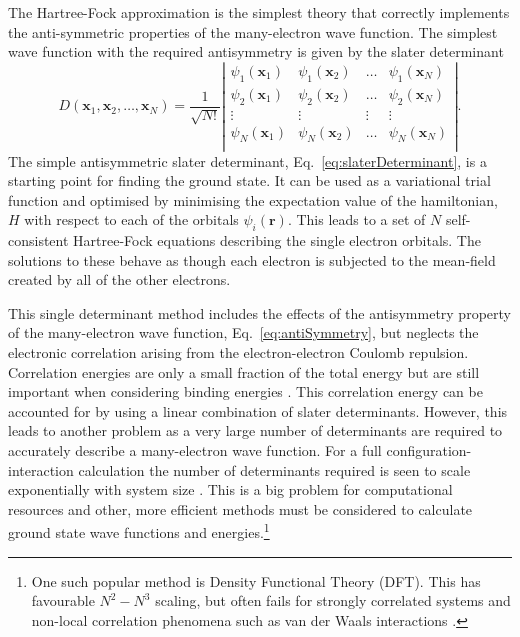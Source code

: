 The Hartree-Fock approximation \cite{modernChemistry,bransden,James1996} is the simplest theory that correctly implements the anti-symmetric properties of the many-electron wave function. The simplest wave function with the required antisymmetry is given by the slater determinant
\begin{equation}
\label{eq:slaterDeterminant}
D(\textbf{x}_1,\textbf{x}_2,\dotsc,\textbf{x}_N) = \frac{1}{\sqrt{N!}}
\left\lvert 
\begin{array}{cccc} 
\psi_1(\textbf{x}_1) & \psi_1(\textbf{x}_2) & \dotsc & \psi_1(\textbf{x}_N) \\ 
\psi_2(\textbf{x}_1) & \psi_2(\textbf{x}_2) & \dotsc & \psi_2(\textbf{x}_N) \\ 
\vdots &\vdots &\vdots &\vdots  \\
\psi_N(\textbf{x}_1) & \psi_N(\textbf{x}_2) & \dotsc & \psi_N(\textbf{x}_N) \\ 
\end{array}
\right\rvert.
\end{equation}
The simple antisymmetric slater determinant, Eq.~\ref{eq:slaterDeterminant}, is a starting point for finding the ground state. It can be used as a variational trial function and optimised by minimising the expectation value of the hamiltonian, $ H$ with respect to each of the orbitals $\psi_i(\textbf{r})$. This leads to a set of $N$ self-consistent Hartree-Fock equations describing the single electron orbitals. The solutions to these behave as though each electron is subjected to the mean-field created by all of the other electrons.

This single determinant method includes the effects of the antisymmetry property of the many-electron wave function, Eq.~\ref{eq:antiSymmetry}, but neglects the electronic correlation arising from the electron-electron Coulomb repulsion. Correlation energies are only a small fraction of the total energy but are still important when considering binding energies \cite{Foulkes2001}. This correlation energy can be accounted for by using a linear combination of slater determinants. However, this leads to another problem as a very large number of determinants are required to accurately describe a many-electron wave function. For a full configuration-interaction calculation the number of determinants required is seen to scale exponentially with system size \cite{Foulkes2001}. This is a big problem for computational resources and other, more efficient methods must be considered to calculate ground state wave functions and energies.\footnote{One such popular method is Density Functional Theory (DFT). This has favourable $N^2-N^3$ scaling, but often fails for strongly correlated systems and non-local correlation phenomena such as van der Waals interactions
\cite{Mazzone2006}. }

